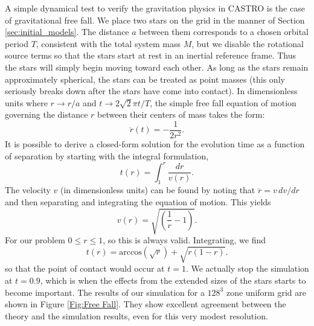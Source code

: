 \documentclass{emulateapj}
\begin{document}
A simple dynamical test to verify the gravitation physics in CASTRO is
the case of gravitational free fall. We place two stars on the grid 
in the manner of Section \ref{sec:initial_models}. The distance $a$ between 
them corresponds to a chosen orbital period $T$, consistent with the total
system mass $M$, but we disable the rotational source terms so that 
the stars start at rest in an inertial reference frame. 
Thus the stars will simply begin moving toward each other.
As long as the stars remain approximately spherical, the stars can be 
treated as point masses (this only seriously breaks down after the stars
have come into contact). In dimensionless units where $r \to r / a$ and 
$t \to 2\sqrt{2}\pi t / T$, the simple free fall equation of motion governing the
distance $r$ between their centers of mass takes the form:
\begin{equation}
  \ddot{r}(t) = - \frac{1}{2r^2}.
\end{equation}
It is possible to derive a closed-form solution for the evolution time
as a function of separation by starting with the integral formulation,
\begin{equation}
  t(r) = \int_{1}^{r} \frac{dr}{v(r)}.
\end{equation}
The velocity $v$ (in dimensionless units) can be found by noting that 
$\ddot{r} = v\, dv / dr$ and then separating and integrating the equation 
of motion. This yields 
\begin{equation}
  v(r) = \sqrt{\left(\frac{1}{r} - 1\right)}.
\end{equation}
For our problem $0 \leq r \leq 1$, so this is always valid. Integrating, we find
\begin{equation}
  t(r) = \text{arccos}\left(\sqrt{r}\right) + \sqrt{r \left(1 - r\right)}. \label{analyticalFreeFall}
\end{equation}
so that the point of contact would occur at $t = 1$. We actually stop the simulation
at $t = 0.9$, which is when the effects from the extended sizes of the stars
starts to become important. The results of our simulation for a $128^3$ zone 
uniform grid are shown in Figure \ref{Fig:Free Fall}. They show excellent agreement
between the theory and the simulation results, even for this very modest resolution.
\end{document}
